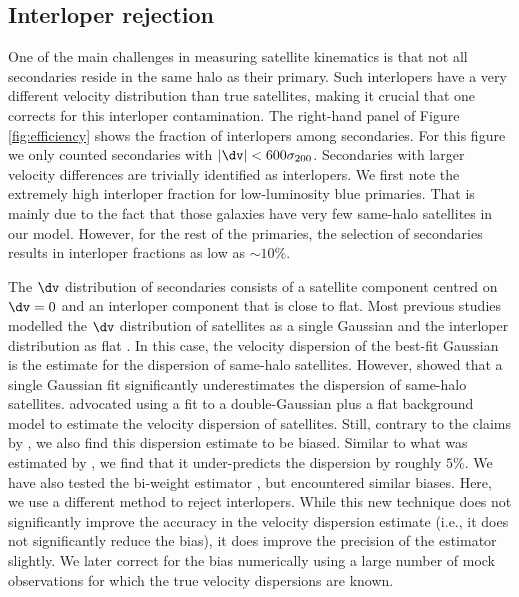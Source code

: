 \documentclass[fleqn,usenatbib,useAMS]{mnras}
\begin{document}
	\subsection{Interloper rejection}
	\label{subsec:interloper_rejection}
	
	One of the main challenges in measuring satellite kinematics is that not all secondaries reside in the same halo as their primary. Such interlopers have a very different velocity distribution than true satellites, making it crucial that one corrects for this interloper contamination. The right-hand panel of Figure \ref{fig:efficiency} shows the fraction of interlopers among secondaries. For this figure we only counted secondaries with $|\dv| < 600 \sigma_{200}$. Secondaries with larger velocity differences are trivially identified as interlopers. We first note the extremely high interloper fraction for low-luminosity blue primaries. That is mainly due to the fact that those galaxies have very few same-halo satellites in our model. However, for the rest of the primaries, the selection of secondaries results in interloper fractions as low as $\sim 10\%$.
	
	The $\dv$ distribution of secondaries consists of a satellite component centred on $\dv = 0$ and an interloper component that is close to flat. Most previous studies modelled the $\dv$ distribution of satellites as a single Gaussian and the interloper distribution as flat \citep[][]{McKay+02, Prada+03, Brainerd+03, vdBosch+04, Conroy+07}. In this case, the velocity dispersion of the best-fit Gaussian is the estimate for the dispersion of same-halo satellites. However, \cite{Becker+07} showed that a single Gaussian fit significantly underestimates the dispersion of same-halo satellites. \cite{More+09b} advocated using a fit to a double-Gaussian plus a flat background model to estimate the velocity dispersion of satellites. Still, contrary to the claims by \cite{More+09b}, we also find this dispersion estimate to be biased. Similar to what was estimated by \cite{Becker+07}, we find that it under-predicts the dispersion by roughly $5\%$. We have also tested the bi-weight estimator \citep{Beers+90}, but encountered similar biases. Here, we use a different method to reject interlopers. While this new technique does not significantly improve the accuracy in the velocity dispersion estimate (i.e., it does not significantly reduce the bias), it does improve the precision of the estimator slightly. We later correct for the bias numerically using a large number of mock observations for which the true velocity dispersions are known.
	
\end{document}
